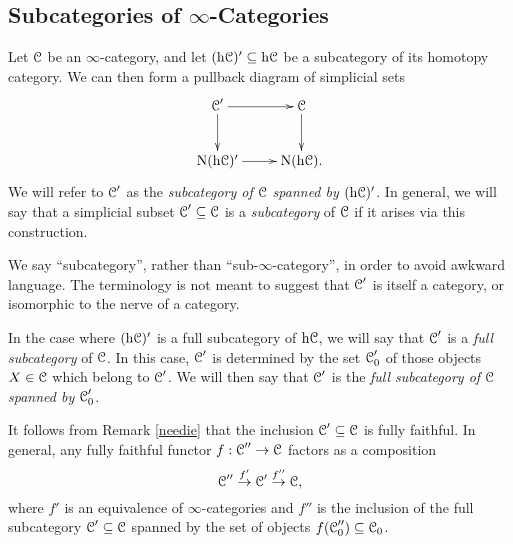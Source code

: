 \subsection{Subcategories of $\infty$-Categories}
\begin{1.2.11 Subcategories of inf-cats}
Let $\operatorname{\mathcal{C}}$ be an $\infty$-category, and let $(\rm{h} \it{\operatorname{\mathcal{C}}})' \subseteq \rm{h} \it{\operatorname{\mathcal{C}}}$ be a subcategory of its homotopy category. We can then form a pullback diagram of simplicial sets
$$ \xymatrix{ \calC' \ar[r] \ar[d] & \calC \ar[d] \\
\Nerve (\h{\calC})' \ar[r] & \Nerve (\h{ \calC}). }$$
We will refer to $\operatorname{\mathcal{C}}'$ as the {\it subcategory of $\operatorname{\mathcal{C}}$ spanned by $(\rm{h} \it{\operatorname{\mathcal{C}}})'$}. In general, we will say that a simplicial subset $\operatorname{\mathcal{C}}' \subseteq \operatorname{\mathcal{C}}$ is a {\it subcategory} of $\operatorname{\mathcal{C}}$ if it arises via this construction.

\begin{remark}
We say ``subcategory'', rather than ``sub-$\infty$-category'', in
order to avoid awkward language. The terminology is not meant to
suggest that $\operatorname{\mathcal{C}}'$ is itself a category, or isomorphic to the nerve
of a category.
\end{remark}

In the case where $(\rm{h} \it{\operatorname{\mathcal{C}}})'$ is a full subcategory of $\rm{h} \it{\operatorname{\mathcal{C}}}$, we will say that
$\operatorname{\mathcal{C}}'$ is a {\it full subcategory} of $\operatorname{\mathcal{C}}$. In this case, $\operatorname{\mathcal{C}}'$ is determined by the set
$\operatorname{\mathcal{C}}'_0$ of those objects $X \in \operatorname{\mathcal{C}}$ which belong to $\operatorname{\mathcal{C}}'$. We will then say that
$\operatorname{\mathcal{C}}'$ is the {\it full subcategory of $\operatorname{\mathcal{C}}$ spanned by $\operatorname{\mathcal{C}}'_0$}.

It follows from Remark \ref{needie} that
the inclusion $\operatorname{\mathcal{C}}' \subseteq \operatorname{\mathcal{C}}$ is fully faithful. In general, any fully faithful functor $f: \operatorname{\mathcal{C}}'' \rightarrow \operatorname{\mathcal{C}}$ factors as a composition
$$ \operatorname{\mathcal{C}}'' \stackrel{f'}{\rightarrow} \operatorname{\mathcal{C}}' \stackrel{f''}{\rightarrow} \operatorname{\mathcal{C}},$$
where $f'$ is an equivalence of $\infty$-categories and $f''$ is the inclusion of the full subcategory
$\operatorname{\mathcal{C}}' \subseteq \operatorname{\mathcal{C}}$ spanned by the set of objects $f( \operatorname{\mathcal{C}}''_0 ) \subseteq \operatorname{\mathcal{C}}_0$.
\end{1.2.11 Subcategories of inf-cats}
